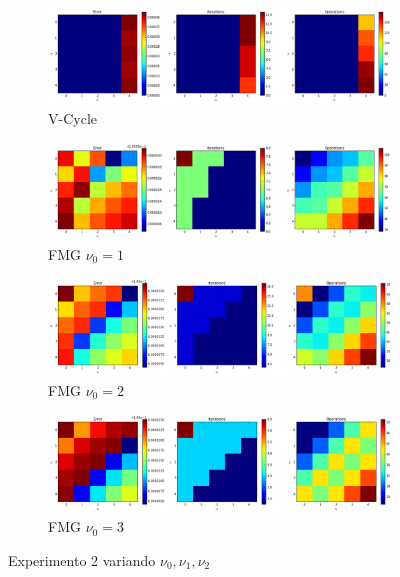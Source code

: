 \documentclass[letter, 10pt]{article}
\begin{document}
\begin{figure}[H]
\begin{subfigure}{\textwidth}
  \centering
  \includegraphics[scale=0.4]{e2_vcycle.png}
  \caption{V-Cycle}
\end{subfigure}
\begin{subfigure}{\textwidth}
  \centering
  \includegraphics[scale=0.4]{fmg_v0_1.png}
  \caption{FMG $\nu_0=1$ }
\end{subfigure}
\begin{subfigure}{\textwidth}
  \centering
  \includegraphics[scale=0.4]{fmg_v0_2.png}
  \caption{FMG $\nu_0=2$ }
\end{subfigure}
\begin{subfigure}{\textwidth}
  \centering
  \includegraphics[scale=0.4]{fmg_v0_3.png}
  \caption{FMG $\nu_0=3$ }
\end{subfigure}

    \caption{Experimento 2 variando $\nu_0,\nu_1,\nu_2$}
    \label{fig:exp2}
\end{figure}
\end{document}
